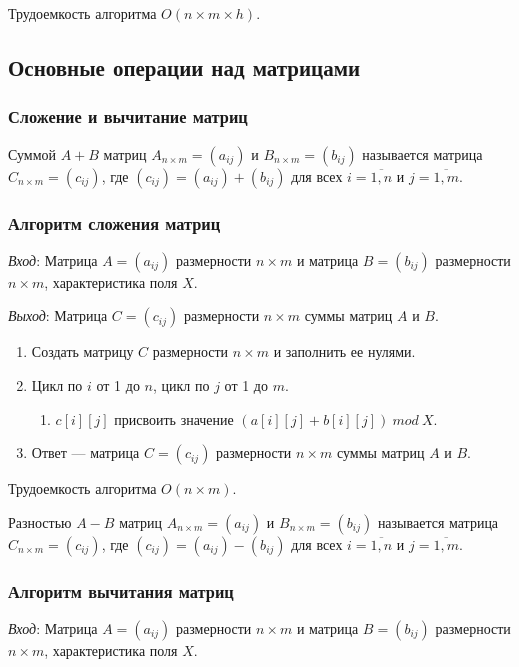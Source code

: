 \documentclass[bachelor, och, labwork]{shiza}
\begin{document}
Трудоемкость алгоритма $O(n \times m \times h)$.

\subsection{Основные операции над матрицами}
\subsubsection{Сложение и вычитание матриц}
Суммой $A+B$ матриц $A_{n\times m}=(a_{ij})$ и $B_{n\times m}=(b_{ij})$ называется
матрица $C_{n\times m}=(c_{ij})$, где $(c_{ij})=(a_{ij})+(b_{ij})$ для всех $i=\overline{1,n}$
и $j=\overline{1,m}$.

\subsubsection{Алгоритм сложения матриц}

\textit{Вход}: Матрица $A=(a_{ij})$ размерности $n\times m$ и
матрица $B=(b_{ij})$ размерности $n\times m$, характеристика поля $X$.

\textit{Выход}: Матрица $C=(c_{ij})$ размерности $n\times m$ суммы 
матриц $A$ и $B$.

\begin{enumerate}
    \item Создать матрицу $C$ размерности $n\times m$ и заполнить ее нулями.
    \item Цикл по $i$ от 1 до $n$, цикл по $j$ от 1 до $m$.
    \begin{enumerate}
        \item $c[i][j]$ присвоить значение $(a[i][j] + b[i][j]) ~mod~ X$.
    \end{enumerate}
    \item Ответ --- матрица $C=(c_{ij})$ размерности $n\times m$ суммы матриц $A$ и $B$.
\end{enumerate}

Трудоемкость алгоритма $O(n \times m)$.

Разностью $A-B$ матриц $A_{n\times m}=(a_{ij})$ и $B_{n\times m}=(b_{ij})$ называется
матрица $C_{n\times m}=(c_{ij})$, где $(c_{ij})=(a_{ij})-(b_{ij})$ для всех $i=\overline{1,n}$
и $j=\overline{1,m}$.

\subsubsection{Алгоритм вычитания матриц}

\textit{Вход}: Матрица $A=(a_{ij})$ размерности $n\times m$ и
матрица $B=(b_{ij})$ размерности $n\times m$, характеристика поля $X$.
\end{document}
